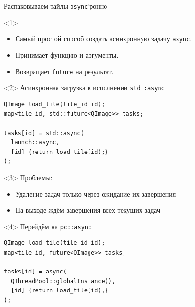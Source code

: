 \documentclass[aspectratio=169,hyperref={unicode},17pt]{beamer}
\begin{document}
\begin{frame}[fragile,t]{Распаковываем тайлы \texttt{async}'ронно}
\begin{onlyenv}<1>
\begin{itemize}
 \item Самый простой способ создать асинхронную задачу \texttt{async}.
 \item Принимает функцию и аргументы.
 \item Возвращает \texttt{future} на результат.
\end{itemize}
\end{onlyenv}
\begin{onlyenv}<2>
Асинхронная загрузка в исполнении \texttt{std::async}
\begin{lstlisting}[style=cppcode]
QImage load_tile(tile_id id);
map<tile_id, std::future<QImage>> tasks;

tasks[id] = std::async(
  launch::async,
  [id] {return load_tile(id);}
);
\end{lstlisting}
\end{onlyenv}
\begin{onlyenv}<3>
Проблемы:
\begin{itemize}
 \item Удаление задач только через ожидание их завершения
 \item На выходе ждём завершения всех текущих задач
\end{itemize}
\end{onlyenv}
\begin{onlyenv}<4>
Перейдём на \texttt{pc::async}
\begin{lstlisting}[style=cppcode]
QImage load_tile(tile_id id);
map<tile_id, future<QImage>> tasks;

tasks[id] = async(
  QThreadPool::globalInstance(),
  [id] {return load_tile(id);}
);
\end{lstlisting}
\end{onlyenv}
\end{frame}
\end{document}
